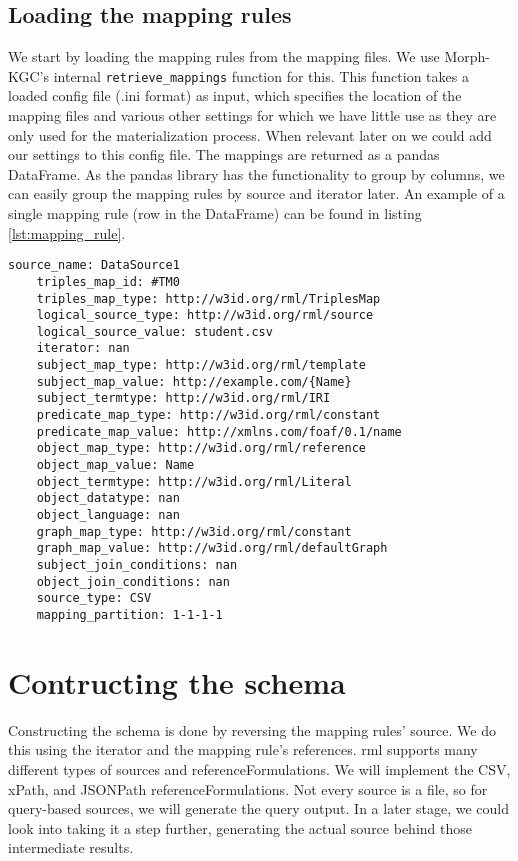 \subsection{Loading the mapping rules}
We start by loading the mapping rules from the mapping files. We use Morph-KGC's internal \texttt{retrieve\_mappings} function for this. This function takes a loaded config file (.ini format) as input, which specifies the location of the mapping files and various other settings for which we have little use as they are only used for the materialization process. When relevant later on we could add our settings to this config file.
The mappings are returned as a pandas DataFrame. As the pandas library has the functionality to group by columns, we can easily group the mapping rules by source and iterator later. An example of a single mapping rule (row in the DataFrame) can be found in listing \ref{lst:mapping_rule}.

\begin{lstlisting}[caption={Example of a mapping rule in Morph-KGC}, label={lst:mapping_rule}, captionpos=b, basicstyle=\small]
    source_name: DataSource1 
    triples_map_id: #TM0
    triples_map_type: http://w3id.org/rml/TriplesMap
    logical_source_type: http://w3id.org/rml/source
    logical_source_value: student.csv
    iterator: nan
    subject_map_type: http://w3id.org/rml/template
    subject_map_value: http://example.com/{Name}
    subject_termtype: http://w3id.org/rml/IRI
    predicate_map_type: http://w3id.org/rml/constant
    predicate_map_value: http://xmlns.com/foaf/0.1/name
    object_map_type: http://w3id.org/rml/reference
    object_map_value: Name
    object_termtype: http://w3id.org/rml/Literal
    object_datatype: nan
    object_language: nan
    graph_map_type: http://w3id.org/rml/constant
    graph_map_value: http://w3id.org/rml/defaultGraph
    subject_join_conditions: nan
    object_join_conditions: nan
    source_type: CSV
    mapping_partition: 1-1-1-1
\end{lstlisting}

\section{Contructing the schema}
\label{section:constructing_schema}
Constructing the schema is done by reversing the mapping rules' source. We do this using the iterator and the mapping rule's references. \acrshort{rml} supports many different types of sources and referenceFormulations. We will implement the CSV, xPath, and JSONPath referenceFormulations. Not every source is a file, so for query-based sources, we will generate the query output. In a later stage, we could look into taking it a step further, generating the actual source behind those intermediate results.

